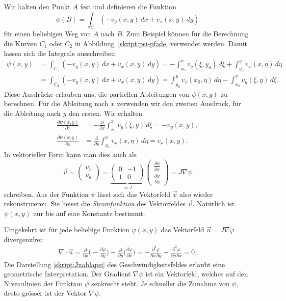Wir halten den Punkt $A$ fest und definieren die Funktion
\[
\psi(B)
=
\int_C (-v_y(x,y)\,dx + v_x(x,y)\,dy)
\]
für einen beliebigen Weg von $A$ nach $B$. 
Zum Beispiel können für die Berechnung die Kurven
$C_1$ oder $C_2$ in Abbildung~\ref{skript:psi-pfade}
verwendet werden.
Damit lassen sich die Integrale ausschreiben:
\begin{align*}
\psi(x,y)
&=
\int_{C_1} (-v_y(x,y)\,dx + v_x(x,y)\,dy)
=
-\int_{x_0}^x v_y(\xi, y_0)\,d\xi
+
\int_{y_0}^y v_x(x,\eta)\,d\eta
\\
&=
\int_{C_2} (-v_y(x,y)\,dx + v_x(x,y)\,dy)
=
\int_{y_0}^y v_x(x_0,\eta)\,d\eta
-
\int_{x_0}^x v_y(\xi,y)\,d\xi.
\end{align*}
Diese Ausdrücke erlauben uns, die partiellen Ableitungen von $\psi(x,y)$
zu berechnen.
Für die Ableitung nach $x$ verwenden wir den zweiten Ausdruck, für die
Ableitung nach $y$ den ersten.
Wir erhalten
\begin{align*}
\frac{\partial\psi(x,y)}{\partial x}
&=
-\frac{\partial}{\partial x} \int_{x_0}^x v_y(\xi,y)\,d\xi
=
-v_y(x,y),
\\
\frac{\partial\psi(x,y)}{\partial y}
&=
\frac{\partial}{\partial y} \int_{y_0}^y v_x(x,\eta)\,d\eta
=
v_x(x,y).
\end{align*}
In vektorieller Form kann man dies auch als
\begin{equation}
\vec{v}
=
\begin{pmatrix}v_x\\v_y \end{pmatrix}
=
\underbrace{
\begin{pmatrix}0&-1\\1&0\end{pmatrix}
}_{\displaystyle=J}
\begin{pmatrix}
\frac{\partial\psi}{\partial x}\\
\frac{\partial\psi}{\partial y}
\end{pmatrix}
=
J\nabla\psi
\label{skript:Jnablapsi}
\end{equation}
schreiben.
Aus der Funktion $\psi$ lässt sich das Vektorfeld $\vec{v}$ also wieder
rekonstruieren.
Sie heisst die {\em Stromfunktion} des Vektorfeldes $\vec{v}$.
Natürlich ist $\psi(x,y)$ nur bis auf eine Konstante bestimmt.

Umgekehrt ist für jede beliebige Funktion $\varphi(x,y)$ das Vektorfeld
$\vec{u}=J\nabla\varphi$ divergenzfrei:
\begin{align*}
\nabla\cdot\vec{u}
=
\frac{\partial}{\partial x}
\biggl(-\frac{\partial\varphi}{\partial y}\biggr)
+
\frac{\partial}{\partial y}
\biggl(\frac{\partial\varphi}{\partial x}\biggr)
=
-\frac{\partial^2\varphi}{\partial x\,\partial y}
+\frac{\partial^2\varphi}{\partial y\,\partial x}
=
0.
\end{align*}
Die Darstellung \eqref{skript:Jnablapsi} des Geschwindigkeitsfeldes 
erlaubt eine geometrische Interpretation.
Der Gradient $\nabla\psi$ ist ein Vektorfeld, welches auf den
Niveaulinien der Funktion $\psi$ senkrecht steht.
Je schneller die Zunahme von $\psi$, desto grösser ist der
Vektor $\nabla\psi$.

